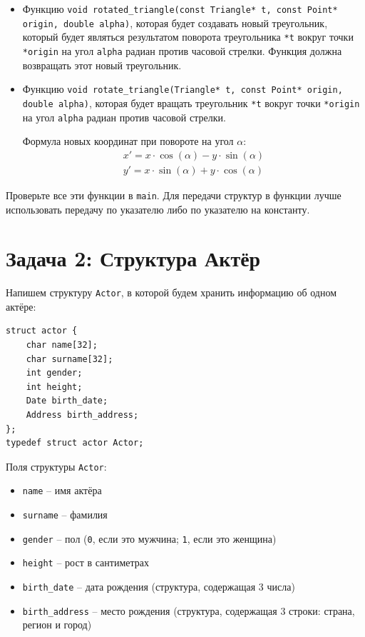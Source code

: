 \documentclass{article}
\begin{document}
\begin{itemize}
\item Функцию \texttt{void rotated\_triangle(const Triangle* t, const Point* origin, double alpha)}, которая будет создавать новый треугольник, который будет являться результатом поворота треугольника \texttt{*t} вокруг точки \texttt{*origin} на угол \texttt{alpha} радиан против часовой стрелки. Функция должна возвращать этот новый треугольник.

\item Функцию \texttt{void rotate\_triangle(Triangle* t, const Point* origin, double alpha)}, которая будет вращать треугольник \texttt{*t} вокруг точки \texttt{*origin} на угол \texttt{alpha} радиан против часовой стрелки.

Формула новых координат при повороте на угол $\alpha$:
\begin{align*}
x' = x \cdot \cos(\alpha) - y \cdot \sin(\alpha) \\
y' = x \cdot \sin(\alpha) + y \cdot \cos(\alpha)
\end{align*}
\end{itemize}

Проверьте все эти функции в \texttt{main}. Для передачи структур в функции лучше использовать передачу по указателю либо по указателю на константу.

\newpage
\section*{Задача 2: Структура Актёр}
Напишем структуру \texttt{Actor}, в которой будем хранить информацию об одном актёре:
\begin{lstlisting}
struct actor {
    char name[32];
    char surname[32];
    int gender;
    int height;
    Date birth_date;
    Address birth_address;
};
typedef struct actor Actor;
\end{lstlisting}

Поля структуры \texttt{Actor}:
\begin{itemize}
\item \texttt{name} -- имя актёра
\item \texttt{surname} -- фамилия
\item \texttt{gender} -- пол (\texttt{0}, если это мужчина; \texttt{1}, если это женщина)
\item \texttt{height} -- рост в сантиметрах
\item \texttt{birth\_date} -- дата рождения (структура, содержащая 3 числа)
\item \texttt{birth\_address} -- место рождения (структура, содержащая 3 строки: страна, регион и город)
\end{itemize}
\end{document}

